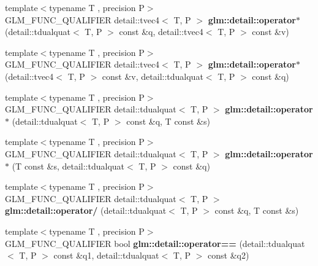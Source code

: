 \begin{DoxyCompactItemize}
\item 
{\footnotesize template$<$typename T , precision P$>$ }\\G\+L\+M\+\_\+\+F\+U\+N\+C\+\_\+\+Q\+U\+A\+L\+I\+F\+I\+ER detail\+::tvec4$<$ T, P $>$ {\bfseries glm\+::detail\+::operator$\ast$} (detail\+::tdualquat$<$ T, P $>$ const \&q, detail\+::tvec4$<$ T, P $>$ const \&v)\hypertarget{dual__quaternion_8inl_a977e73a0991cf9747d291055281bba99}{}\label{dual__quaternion_8inl_a977e73a0991cf9747d291055281bba99}

\item 
{\footnotesize template$<$typename T , precision P$>$ }\\G\+L\+M\+\_\+\+F\+U\+N\+C\+\_\+\+Q\+U\+A\+L\+I\+F\+I\+ER detail\+::tvec4$<$ T, P $>$ {\bfseries glm\+::detail\+::operator$\ast$} (detail\+::tvec4$<$ T, P $>$ const \&v, detail\+::tdualquat$<$ T, P $>$ const \&q)\hypertarget{dual__quaternion_8inl_a68f661e14500498fba71d86fb337663a}{}\label{dual__quaternion_8inl_a68f661e14500498fba71d86fb337663a}

\item 
{\footnotesize template$<$typename T , precision P$>$ }\\G\+L\+M\+\_\+\+F\+U\+N\+C\+\_\+\+Q\+U\+A\+L\+I\+F\+I\+ER detail\+::tdualquat$<$ T, P $>$ {\bfseries glm\+::detail\+::operator$\ast$} (detail\+::tdualquat$<$ T, P $>$ const \&q, T const \&s)\hypertarget{dual__quaternion_8inl_a965b953d4689372dd4df294473cea0fd}{}\label{dual__quaternion_8inl_a965b953d4689372dd4df294473cea0fd}

\item 
{\footnotesize template$<$typename T , precision P$>$ }\\G\+L\+M\+\_\+\+F\+U\+N\+C\+\_\+\+Q\+U\+A\+L\+I\+F\+I\+ER detail\+::tdualquat$<$ T, P $>$ {\bfseries glm\+::detail\+::operator$\ast$} (T const \&s, detail\+::tdualquat$<$ T, P $>$ const \&q)\hypertarget{dual__quaternion_8inl_a7b88b1a7895198efe97e920a607de590}{}\label{dual__quaternion_8inl_a7b88b1a7895198efe97e920a607de590}

\item 
{\footnotesize template$<$typename T , precision P$>$ }\\G\+L\+M\+\_\+\+F\+U\+N\+C\+\_\+\+Q\+U\+A\+L\+I\+F\+I\+ER detail\+::tdualquat$<$ T, P $>$ {\bfseries glm\+::detail\+::operator/} (detail\+::tdualquat$<$ T, P $>$ const \&q, T const \&s)\hypertarget{dual__quaternion_8inl_a6fcb533c98cff35eddd2b5867e9f3acf}{}\label{dual__quaternion_8inl_a6fcb533c98cff35eddd2b5867e9f3acf}

\item 
{\footnotesize template$<$typename T , precision P$>$ }\\G\+L\+M\+\_\+\+F\+U\+N\+C\+\_\+\+Q\+U\+A\+L\+I\+F\+I\+ER bool {\bfseries glm\+::detail\+::operator==} (detail\+::tdualquat$<$ T, P $>$ const \&q1, detail\+::tdualquat$<$ T, P $>$ const \&q2)\hypertarget{dual__quaternion_8inl_a4ecfd668de208187042cb2a90d669e4e}{}\label{dual__quaternion_8inl_a4ecfd668de208187042cb2a90d669e4e}


\end{DoxyCompactItemize}
